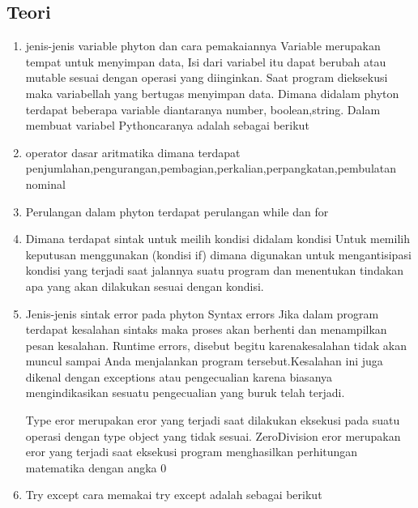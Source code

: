 \subsection{Teori}
\begin{enumerate}
	\item jenis-jenis variable phyton dan cara pemakaiannya
Variable merupakan tempat untuk menyimpan data, Isi dari variabel itu dapat berubah atau mutable sesuai dengan operasi yang diinginkan. Saat program dieksekusi maka variabellah yang bertugas menyimpan data. Dimana didalam phyton terdapat beberapa variable diantaranya number, boolean,string. Dalam membuat variabel Pythoncaranya adalah sebagai berikut
    
    \item operator dasar aritmatika 
dimana terdapat penjumlahan,pengurangan,pembagian,perkalian,perpangkatan,pembulatan nominal
    
    \item Perulangan
dalam phyton terdapat perulangan while dan for
    
    \item Dimana terdapat sintak untuk meilih kondisi didalam kondisi
Untuk memilih keputusan menggunakan (kondisi if) dimana digunakan untuk mengantisipasi kondisi yang terjadi saat jalannya suatu program dan menentukan tindakan apa yang akan dilakukan sesuai dengan kondisi.
    

    \item Jenis-jenis sintak error pada phyton
 Syntax errors Jika dalam program terdapat kesalahan sintaks maka proses akan berhenti dan menampilkan pesan kesalahan.
Runtime errors, disebut begitu karenakesalahan tidak akan muncul sampai Anda menjalankan program tersebut.Kesalahan ini juga dikenal dengan exceptions atau pengecualian karena biasanya mengindikasikan sesuatu pengecualian yang buruk telah terjadi.

Type eror merupakan eror yang terjadi saat dilakukan eksekusi pada suatu operasi dengan type object yang tidak sesuai.
ZeroDivision eror merupakan eror yang terjadi saat eksekusi program menghasilkan perhitungan matematika dengan angka 0

 \item Try except
cara memakai try except adalah sebagai berikut
    
    \end{enumerate}
